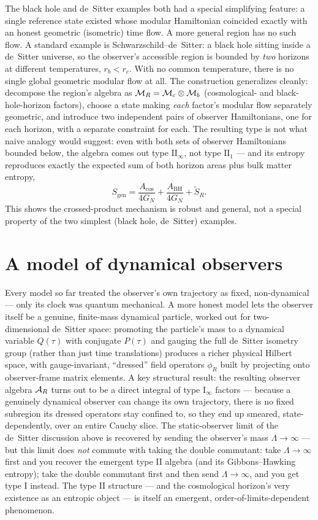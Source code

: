 The black hole and de~Sitter examples both had a special simplifying feature: a single reference state existed
whose modular Hamiltonian coincided exactly with an honest geometric (isometric) time flow. A more general
region has no such flow. A standard example is Schwarzschild--de~Sitter: a black hole sitting inside a
de~Sitter universe, so the observer's accessible region is bounded by \emph{two} horizons at different
temperatures, $r_b<r_c$. With no common temperature, there is no single global geometric modular flow at all.
The construction generalizes cleanly: decompose the region's algebra as $\mathcal{M}_R=\mathcal{M}_c\otimes\mathcal{M}_b$ (cosmological-
and black-hole-horizon factors), choose a state making \emph{each} factor's modular flow separately geometric,
and introduce two independent pairs of observer Hamiltonians, one for each horizon, with a separate constraint
for each. The resulting type is not what naive analogy would suggest: even with both sets of observer
Hamiltonians bounded below, the algebra comes out type $\mathrm{II}_\infty$, not type $\mathrm{II}_1$ — and its
entropy reproduces exactly the expected sum of both horizon areas plus bulk matter entropy,
\[
S_{\text{gen}}=\frac{A_{\text{cos}}}{4G_N}+\frac{A_{\text{BH}}}{4G_N}+\widetilde S_R .
\]
This shows the crossed-product mechanism is robust and general, not a special property of the two simplest
(black hole, de~Sitter) examples.

\section{A model of dynamical observers}

Every model so far treated the observer's own trajectory as fixed, non-dynamical — only its clock was quantum
mechanical. A more honest model lets the observer itself be a genuine, finite-mass dynamical particle, worked
out for two-dimensional de~Sitter space: promoting the particle's mass to a dynamical variable $Q(\tau)$ with
conjugate $P(\tau)$ and gauging the full de~Sitter isometry group (rather than just time translations)
produces a richer physical Hilbert space, with gauge-invariant, ``dressed'' field operators $\phi_R$ built by
projecting onto observer-frame matrix elements. A key structural result: the resulting observer algebra
$\mathcal{A}_R$ turns out to be a direct integral of type $\mathrm{I}_\infty$ factors — because a genuinely dynamical
observer can change its own trajectory, there is no fixed subregion its dressed operators stay confined to, so
they end up smeared, state-dependently, over an entire Cauchy slice. The static-observer limit of the
de~Sitter discussion above is recovered by sending the observer's mass $\Lambda\to\infty$ — but this limit does
\emph{not} commute with taking the double commutant: take $\Lambda\to\infty$ first and you recover the emergent
type II algebra (and its Gibbons--Hawking entropy); take the double commutant first and then send
$\Lambda\to\infty$, and you get type I instead. The type II structure — and the cosmological horizon's very
existence as an entropic object — is itself an emergent, order-of-limits-dependent phenomenon.


